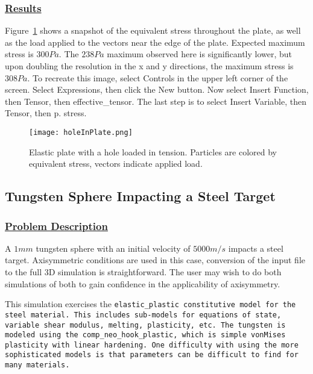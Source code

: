 \subsubsection*{\underline{Results}}

Figure~\ref{fig:holeInPlate} shows a snapshot of the equivalent stress
throughout the plate, as well as the load applied to the vectors near the
edge of the plate.  Expected maximum stress is $300 Pa$.  The $238 Pa$ maximum
observed here is significantly lower, but upon doubling the resolution in the
x and y directions, the maximum stress is $308 Pa$.  To recreate this image, select
Controls in the upper left corner of the screen.  Select Expressions, then click the New 
button.  Now select Insert Function, then Tensor, then effective\_tensor.  The last step is
to select Insert Variable, then Tensor, then p. stress.  
\begin{figure}
  \center
  \texttt{[image: holeInPlate.png]}
  \caption{Elastic plate with a hole loaded in tension.  Particles are
           colored by equivalent stress, vectors indicate applied load.}
  \label{fig:holeInPlate}
\end{figure}
\newpage

\subsection*{\center Tungsten Sphere Impacting a Steel Target}
\subsubsection*{\underline{Problem Description}}
A $1 mm$ tungsten sphere with an initial velocity of $5000 m/s$
impacts a steel target.  Axisymmetric conditions are used in this case,
conversion of the input file to the full 3D simulation is straightforward.
The user may wish to do both simulations of both to gain confidence in the
applicability of axisymmetry. 

This simulation exercises the \tt elastic\_plastic \normalfont
constitutive model for the
steel material. This includes sub-models for equations of state,
variable shear modulus, melting, plasticity, etc.  The tungsten is modeled
using the \tt comp\_neo\_hook\_plastic, \normalfont which is simple vonMises
plasticity with linear hardening.  One difficulty with using the more 
sophisticated models is that parameters can be difficult to find for many
materials.

